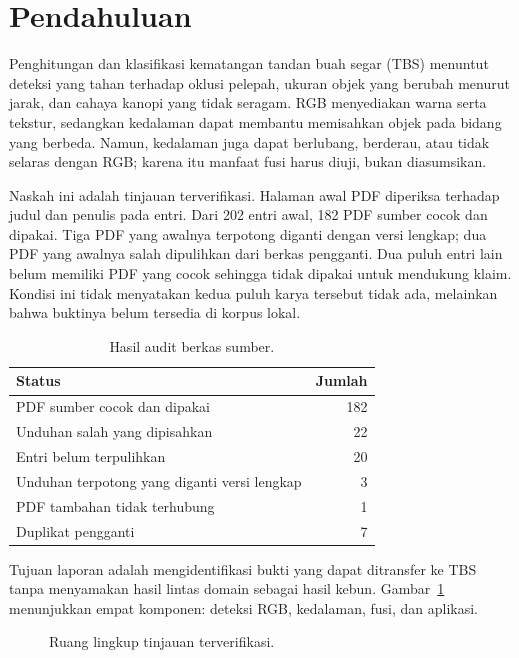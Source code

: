 
\section{Pendahuluan}

Penghitungan dan klasifikasi kematangan tandan buah segar (TBS) menuntut
deteksi yang tahan terhadap oklusi pelepah, ukuran objek yang berubah menurut
jarak, dan cahaya kanopi yang tidak seragam. RGB menyediakan warna serta
tekstur, sedangkan kedalaman dapat membantu memisahkan objek pada bidang yang
berbeda. Namun, kedalaman juga dapat berlubang, berderau, atau tidak selaras
dengan RGB; karena itu manfaat fusi harus diuji, bukan diasumsikan.

Naskah ini adalah tinjauan terverifikasi. Halaman awal PDF diperiksa terhadap
judul dan penulis pada entri. Dari 202 entri awal, 182 PDF sumber cocok dan
dipakai. Tiga PDF yang awalnya terpotong diganti dengan versi lengkap; dua PDF
yang awalnya salah dipulihkan dari berkas pengganti. Dua puluh entri lain belum
memiliki PDF yang cocok sehingga tidak dipakai untuk mendukung klaim. Kondisi
ini tidak menyatakan kedua puluh karya tersebut tidak ada, melainkan bahwa
buktinya belum tersedia di korpus lokal.

\begin{table}[htbp]
\caption{Hasil audit berkas sumber.}
\label{tab:audit}
\centering
\begin{tabular}{lr}
\toprule
Status & Jumlah \\
\midrule
PDF sumber cocok dan dipakai & 182 \\
Unduhan salah yang dipisahkan & 22 \\
Entri belum terpulihkan & 20 \\
Unduhan terpotong yang diganti versi lengkap & 3 \\
PDF tambahan tidak terhubung & 1 \\
Duplikat pengganti & 7 \\
\bottomrule
\end{tabular}
\end{table}

Tujuan laporan adalah mengidentifikasi bukti yang dapat ditransfer ke TBS tanpa
menyamakan hasil lintas domain sebagai hasil kebun. Gambar~\ref{fig:taxonomy}
menunjukkan empat komponen: deteksi RGB, kedalaman, fusi, dan aplikasi.

\begin{figure}[htbp]
\centering
{}
\caption{Ruang lingkup tinjauan terverifikasi.}
\label{fig:taxonomy}
\end{figure}

